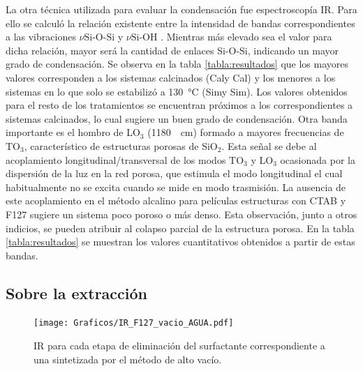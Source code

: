 		La otra técnica utilizada para evaluar la condensación fue espectroscopía IR. Para ello se calculó la relación existente entre la intensidad de bandas correspondientes a las vibraciones $\nu{\text{Si-O-Si}}$ y $\nu{\text{Si-OH}}$ \cite{Pai1986,Innocenzi2003}. Mientras más elevado sea el valor para dicha relación, mayor será la cantidad de enlaces Si-O-Si, indicando un mayor grado de condensación. Se observa en la tabla \ref{tabla:resultados} que los mayores valores corresponden a los sistemas calcinados (Cal\pdmC\space y Cal\pdmF) y los menores a los sistemas en lo que solo se estabilizó a \SI{130}{\celsius} (Sim\pdmC\space y Sim\pdmF). Los valores obtenidos para el resto de los tratamientos se encuentran próximos a los correspondientes a sistemas calcinados, lo cual sugiere un buen grado de condensación. Otra banda importante es el hombro de LO$_3$ (\SI{1180}{\per\cm}) formado a mayores frecuencias de TO$_3$, característico de estructuras porosas de SiO$_2$. Esta señal se debe al acoplamiento longitudinal/transversal de los modos TO$_3$ y LO$_3$ ocasionada por la dispersión de la luz en la red porosa, que estimula el modo longitudinal el cual habitualmente no se excita cuando se mide en modo trasmisión\cite{Innocenzi2003,Lange1990,Lange1989}. La ausencia de este acoplamiento en el método alcalino para películas estructuras con CTAB y F127 sugiere un sistema poco poroso o más denso. Esta observación, junto a otros indicios, se pueden atribuir al colapso parcial de la estructura porosa. En la tabla \ref{tabla:resultados} se muestran los valores cuantitativos obtenidos a partir de estas bandas.	
	
	\subsection{Sobre la extracción}

		\begin{figure}[b!]
			\begin{center}
			\texttt{[image: Graficos/IR\_F127\_vacio\_AGUA.pdf]}
			\caption[FTIR extracción agua ácida.]{IR para cada etapa de eliminación del surfactante correspondiente a una \pdmF\space sintetizada por el método de alto vacío.}
			\label{fig:IR_agua}
			\end{center}
			\end{figure}

